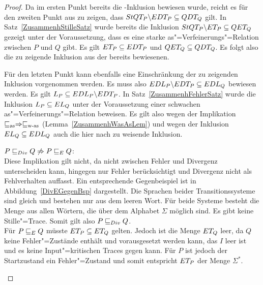 \begin{proof}
  Da im ersten Punkt bereits die \EDT{}-Inklusion bewiesen wurde, reicht es
  für den zweiten Punkt aus zu zeigen, dass $StQT _P\backslash EDT _P
  \subseteq QDT _Q$ gilt. In Satz~\ref{ZusammenhStilleSatz} wurde bereits die
  Inklusion $StQT _P \backslash ET _P \subseteq QET _Q$ gezeigt unter der
  Voraussetzung, dass es eine starke as"=Verfeinerungs"=Relation zwischen
  $P$ und $Q$ gibt. Es gilt $ET _P \subseteq EDT _P$ und $QET _Q \subseteq
  QDT _Q$. Es folgt also die zu zeigende Inklusion aus der bereits bewiesenen.

  Für den letzten Punkt kann ebenfalls eine Einschränkung der zu zeigenden
  Inklusion vorgenommen werden. Es muss also $EDL _P \backslash EDT _P
  \subseteq EDL _Q$ bewiesen werden. Es gilt $L _P \subseteq EDL _P
  \backslash EDT _P$. In Satz~\ref{ZusammenhFehlerSatz} wurde die Inklusion
  $L _P\subseteq EL _Q$ unter der Voraussetzung einer schwachen
  as"=Verfeinerungs"=Relation beweisen. Es gilt also wegen der Implikation
  $\sqsubseteq _{\mathrm{as}} \Rightarrow \sqsubseteq _{\mathrm{w}\text{-}\mathrm{as}}$ (Lemma~\ref{ZusammenhWasAsLem}) und wegen der
  Inklusion $EL _Q \subseteq EDL _Q$ auch die hier nach zu weisende
  Inklusion.

  $P  \sqsubseteq  _{Div} Q \not\Rightarrow P  \sqsubseteq  _E Q$:\\
  Diese Implikation gilt nicht, da \DRel{} nicht zwischen Fehler und Divergenz
  unterscheiden kann, \ERel{} hingegen nur Fehler berücksichtigt und Divergenz
  nicht als Fehlverhalten auffasst. Ein entsprechende Gegenbeispiel ist in
  Abbildung~\ref{DivEGegenBsp} dargestellt. Die Sprachen beider
  Transitionssysteme sind gleich und bestehen nur aus dem leeren Wort. Für
  beide Systeme besteht die Menge \EDT{} aus allen Wörtern, die über dem
  Alphabet $\Sigma$ möglich sind. Es gibt keine Stille"=Trace. Somit gilt also
  $P  \sqsubseteq  _{Div} Q$.\\
  Für $P  \sqsubseteq  _E Q$ müsste $ET _P \subseteq ET _Q$ gelten. Jedoch ist die Menge
  $ET _Q$ leer, da $Q$ keine Fehler"=Zustände enthält und vorausgesetzt werden
  kann, das $I$ leer ist und es keine Input"=kritischen Traces gegen kann. Für
  $P$ ist jedoch der Startzustand ein Fehler"=Zustand und somit entspricht $ET
  _P$ der Menge $\Sigma ^*$.

  \begin{figure}[htbp]
    \begin{center}
\end{center}
\end{figure}
\end{proof}

